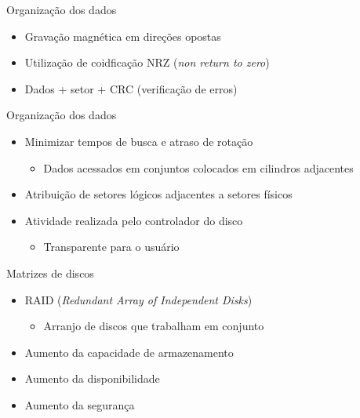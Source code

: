 \documentclass[aspectratio=169,
				xcolor=table]{beamer}
\begin{document}
	\begin{frame}{Organização dos dados}
		\begin{itemize}
			\item Gravação magnética em direções opostas
			\vspace{1em}
			\item Utilização de coidficação NRZ (\textit{non return to zero})
			\vspace{1em}
			\item Dados + setor + CRC (verificação de erros)
		\end{itemize}
	\end{frame}
	
	\begin{frame}{Organização dos dados}
		\begin{itemize}
			\item Minimizar tempos de busca e atraso de rotação
			\begin{itemize}
				\item Dados acessados em conjuntos colocados em cilindros adjacentes
			\end{itemize}
			\vspace{1em}
			\item Atribuição de setores lógicos adjacentes a setores físicos 
			\vspace{1em}
			\item Atividade realizada pelo controlador do disco
			\begin{itemize}
				\item Transparente para o usuário
			\end{itemize}
		\end{itemize}
	\end{frame}
	
	\begin{frame}{Matrizes de discos}
		\begin{itemize}
			\item RAID (\textit{Redundant Array of Independent Disks})
			\begin{itemize}
				\item Arranjo de discos que trabalham em conjunto
			\end{itemize}
			\item Aumento da capacidade de armazenamento
			\vspace{1em}
			\item Aumento da disponibilidade
			\vspace{1em}
			\item Aumento da segurança
		\end{itemize}
	\end{frame}
	
\end{document}
